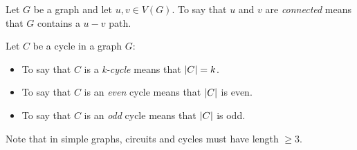 \documentclass[letterpaper,12pt,fleqn]{article}
\begin{document}
\begin{definition}[Connected]
  Let \(G\) be a graph and let \(u,v\in V(G)\).  To say that \(u\) and \(v\) are \emph{connected} means that \(G\)
  contains a \(u-v\) path.
\end{definition}

\begin{definition}[Cycles]
  Let \(C\) be a cycle in a graph \(G\):
  \begin{itemize}
  \item To say that \(C\) is a \emph{k-cycle} means that \(\lvert C\rvert=k\).
  \item To say that \(C\) is an \emph{even} cycle means that \(\lvert C\rvert\) is even.
  \item To say that \(C\) is an \emph{odd} cycle means that \(\lvert C\rvert\) is odd.
  \end{itemize}
\end{definition}

Note that in simple graphs, circuits and cycles must have length \(\ge3\).
\end{document}
